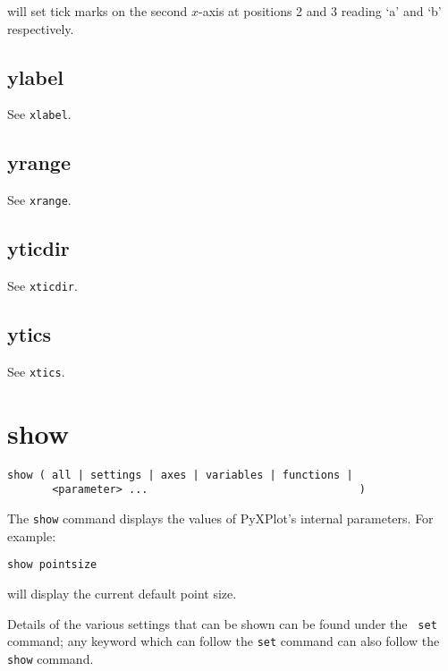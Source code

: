 \documentclass[a4paper,onecolumn,11pt]{book}
\begin{document}
\noindent will set tick marks on the second $x$-axis at positions 2 and 3 reading `a' and
`b' respectively.


\subsection{ylabel}

See {\tt xlabel}.


\subsection{yrange}

See {\tt xrange}.
   

\subsection{yticdir}

See {\tt xticdir}.


\subsection{ytics}

See {\tt xtics}.

\section{show}

\begin{verbatim}
show ( all | settings | axes | variables | functions |
       <parameter> ...                                 )
\end{verbatim}

The {\tt show} command displays the values of PyXPlot's internal parameters. For
example:

\begin{verbatim}
show pointsize
\end{verbatim}

\noindent will display the current default point size.

Details of the various settings that can be shown can be found under the {\tt
set} command; any keyword which can follow the {\tt set} command can also follow
the {\tt show} command.
\end{document}

